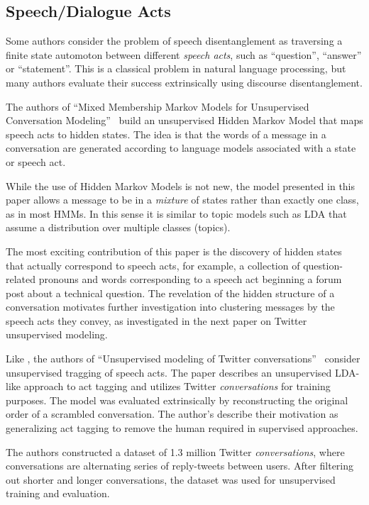 \documentclass[11pt]{article}
\newcommand{\titlecite}[2]{``#1''~\cite{#2}}
\begin{document}
\subsection{Speech/Dialogue Acts}
Some authors consider the problem of speech disentanglement as traversing 
a finite state automoton between different \textit{speech acts}, such as
``question'', ``answer'' or ``statement''. This is a classical problem in
natural language processing, but many authors evaluate their success extrinsically 
using discourse disentanglement.

The authors of \titlecite{Mixed Membership Markov Models for Unsupervised
Conversation Modeling}{Paula} build an unsupervised Hidden Markov Model that 
maps speech acts to hidden states. The idea is that the words of a message in a conversation are generated 
according to language models associated
with a state or speech act. 

While the use of Hidden Markov Models is not new, the model presented in this
paper allows a message to be in a \emph{mixture} of states rather than exactly
one class, as in most HMMs. In this sense it is similar to topic models such as
LDA that assume a distribution over multiple classes (topics).

The most exciting contribution of this paper is the discovery of hidden states
that actually correspond to speech acts, for example, a collection of
question-related pronouns and words corresponding to a speech act beginning a
forum post about a technical question. The revelation of the hidden structure of
a conversation motivates further investigation into clustering messages by the
speech acts they convey, as investigated in the next paper on Twitter
unsupervised modeling.

Like \cite{Paula}, the authors of \titlecite{Unsupervised modeling of Twitter
conversations}{Ritter2010a} consider unsupervised tragging of speech acts.
The paper describes an unsupervised LDA-like approach to act tagging 
and utilizes Twitter \textit{conversations} for
training purposes. The model was evaluated extrinsically by reconstructing 
the original order of a scrambled conversation. The author's describe their motivation as
generalizing act tagging to remove the human required in supervised approaches. 

The authors constructed a dataset of 1.3 million Twitter \textit{conversations}, 
where conversations are alternating series of reply-tweets between users. After filtering out shorter 
and longer conversations, the dataset was used for unsupervised training and evaluation.
\end{document}
